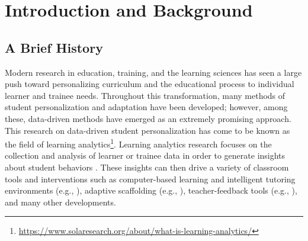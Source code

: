 \documentclass[manuscript,screen,review]{acmart}
\begin{document}


\maketitle


\section{Introduction and Background} \label{sec:intro_background}

\subsection{A Brief History}

Modern research in education, training, and the learning sciences has seen a large push toward personalizing curriculum and the educational process to individual learner and trainee needs. Throughout this transformation, many methods of student personalization and adaptation have been developed; however, among these, data-driven methods have emerged as an extremely promising approach. This research on data-driven student personalization has come to be known as the field of learning analytics\footnote{\href{https://www.solaresearch.org/about/what-is-learning-analytics/}{https://www.solaresearch.org/about/what-is-learning-analytics/}}. Learning analytics research focuses on the collection and analysis of learner or trainee data in order to generate insights about student behaviors \cite{maseleno2018demystifying, Zilvinskis2017}. These insights can then drive a variety of classroom tools and interventions such as computer-based learning and intelligent tutoring environments (e.g., \cite{heffernan2014assistments, leelawong2008designing}), adaptive scaffolding (e.g., \cite{Emerson2020, basu2017learner}), teacher-feedback tools (e.g., \cite{rodriguez2018teacher, Hutchins2023}), and many other developments. 
\end{document}
